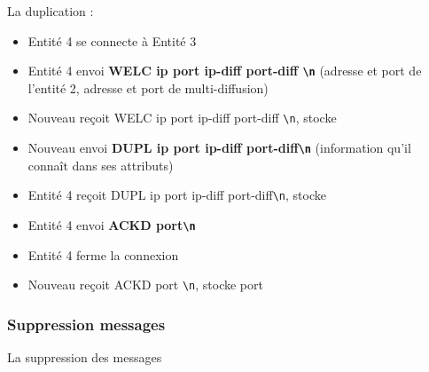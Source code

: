 \documentclass{beamer}
\newcommand*{\escape}[1]{\texttt{\textbackslash#1}}
\begin{document}
\begin{frame}{La duplication :}
	\begin{itemize}
		\item<1-6> Entité 4 se connecte à Entité 3
		\item<2-6> Entité 4 envoi \textbf{WELC ip port ip-diff port-diff \escape{n}} (adresse et port de l’entité 2, adresse et port de multi-diffusion)
		\item<2-6> Nouveau reçoit WELC ip port ip-diff port-diff \escape{n}, stocke
		\item<3-6> Nouveau envoi \textbf{DUPL ip port ip-diff port-diff\escape{n}} (information qu'il connaît dans ses attributs)
		\item<3-6> Entité 4 reçoit DUPL ip port ip-diff port-diff\escape{n}, stocke
		\item<4-6> Entité 4 envoi \textbf{ACKD port\escape{n}}
		\item<5-6> Entité 4 ferme la connexion
		\item<4-6> Nouveau reçoit ACKD port \escape{n}, stocke port
	\end{itemize}
\end{frame}

\subsubsection{Suppression messages}
\begin{frame}
	\begin{center}
		{\Huge La suppression des messages}
	\end{center}
\end{frame}
\end{document}
